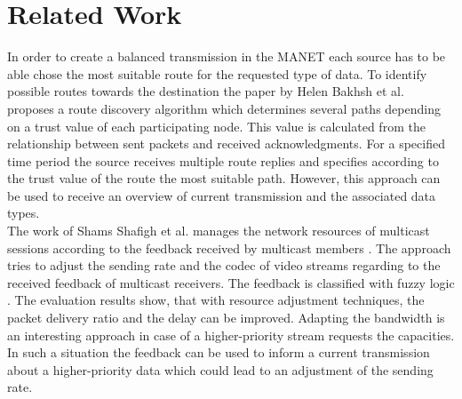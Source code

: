 \documentclass[runningheads]{llncs}
\newcommand{\MANET}{MANET}
\newcommand{\QOS}{QoS}
\newcommand{\VOIP}{VoIP}
\begin{document}
	\section{Related Work}
	In order to create a balanced transmission in the \MANET{} each source has to be able chose the most suitable route for the requested type of data. To identify possible routes towards the destination the paper by Helen Bakhsh et al. \cite{RelatedWork:MultiPath} proposes a route discovery algorithm which determines several paths depending on a trust value of each participating node. This value is calculated from the relationship between sent packets and received acknowledgments. For a specified time period the source receives multiple route replies and specifies according to the trust value of the route the most suitable path. However, this approach can be used to receive an overview of current transmission and the associated data types.\\
	The work of Shams Shafigh et al. manages the network resources of multicast sessions according to the  feedback received by multicast members \cite{ReleatedWork:QoSSessionAdaptation}. The approach tries to adjust the sending rate and the codec of video streams regarding to the received feedback of multicast receivers. The feedback is classified with fuzzy logic \cite{RelatedWorkContent:QoSSessionAdaptationFuzzySets}\cite{RelatedWorkContent:QoSSessionAdaptationFuzzySets2}. The evaluation results show, that with resource adjustment techniques, the packet delivery ratio and the delay can be improved. Adapting the bandwidth is an interesting approach in case of a higher-priority stream requests the capacities. In such a situation the feedback can be used to inform a current transmission about a higher-priority data which could lead to an adjustment of the sending rate.
\end{document}
